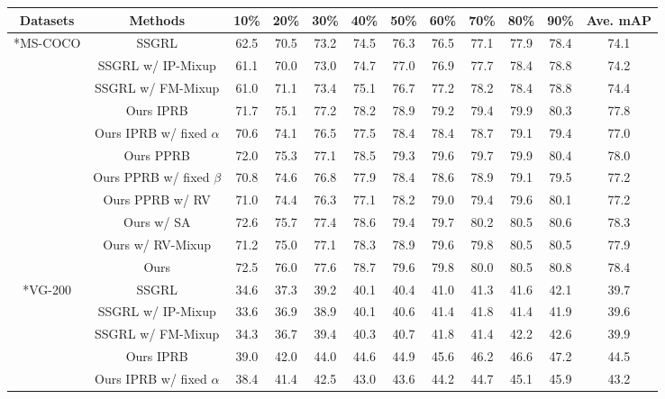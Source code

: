 \documentclass[lettersize,journal]{IEEEtran}
\begin{document}
\begin{table*}
  \centering
  \small
  \begin{tabular}{c|c|ccccccccc|c}
  \hline
  \centering Datasets & Methods & 10\% & 20\% & 30\% & 40\% & 50\% & 60\% & 70\% & 80\% & 90\% & Ave. mAP \\
  \hline
  \hline
  \centering \multirow{10}*{MS-COCO} & SSGRL & 62.5 & 70.5 & 73.2 & 74.5 & 76.3 & 76.5 & 77.1 & 77.9 & 78.4 & 74.1 \\
  \centering ~ & SSGRL w/ IP-Mixup & 61.1 & 70.0 & 73.0 & 74.7 & 77.0 & 76.9 & 77.7 & 78.4 & 78.8 & 74.2 \\
  \centering ~ & SSGRL w/ FM-Mixup & 61.0 & 71.1 & 73.4 & 75.1 & 76.7 & 77.2 & 78.2 & 78.4 & 78.8 & 74.4 \\
  \centering ~ & Ours IPRB & 71.7 & 75.1 & 77.2 & 78.2 & 78.9 & 79.2 & 79.4 & 79.9 & 80.3 & 77.8 \\
  \centering ~ & Ours IPRB w/ fixed $\alpha$ & 70.6 & 74.1 & 76.5 & 77.5 & 78.4 & 78.4 & 78.7 & 79.1 & 79.4 & 77.0 \\
  \centering ~ & Ours PPRB & 72.0 & 75.3 & 77.1 & 78.5 & 79.3 & 79.6 & 79.7 & 79.9 & 80.4 & 78.0 \\
  \centering ~ & Ours PPRB w/ fixed $\beta$ & 70.8 & 74.6 & 76.8 & 77.9 & 78.4 & 78.6 & 78.9 & 79.1 & 79.5 & 77.2 \\
  \centering ~ & Ours PPRB w/ RV & 71.0 & 74.4 & 76.3 & 77.1 & 78.2 & 79.0 & 79.4 & 79.6 & 80.1 & 77.2 \\
  \centering ~ & Ours w/ SA & 72.6 & 75.7 & 77.4 & 78.6 & 79.4 & 79.7 & 80.2 & 80.5 & 80.6 & 78.3 \\
  \centering ~ & Ours w/ RV-Mixup & 71.2 & 75.0 & 77.1 & 78.3 & 78.9 & 79.6 & 79.8 & 80.5 & 80.5 & 77.9 \\
  \centering ~ & Ours & 72.5 & 76.0 & 77.6 & 78.7 & 79.6 & 79.8 & 80.0 & 80.5 & 80.8 & 78.4 \\
  \hline
  \hline
  \centering \multirow{10}*{VG-200} & SSGRL & 34.6 & 37.3 & 39.2 & 40.1 & 40.4 & 41.0 & 41.3 & 41.6 & 42.1 & 39.7 \\
   \centering ~ & SSGRL w/ IP-Mixup & 33.6 & 36.9 & 38.9 & 40.1 & 40.6 & 41.4 & 41.8 & 41.4 & 41.9 & 39.6 \\
  \centering ~ & SSGRL w/ FM-Mixup & 34.3 & 36.7 & 39.4 & 40.3 & 40.7 & 41.8 & 41.4 & 42.2 & 42.6 & 39.9 \\
  \centering ~ & Ours IPRB & 39.0 & 42.0 & 44.0 & 44.6 & 44.9 & 45.6 & 46.2 & 46.6 & 47.2 & 44.5 \\
  \centering ~ & Ours IPRB w/ fixed $\alpha$ & 38.4 & 41.4 & 42.5 & 43.0 & 43.6 & 44.2 & 44.7 & 45.1 & 45.9 & 43.2 \\

\end{tabular}
\end{table*}
\end{document}
